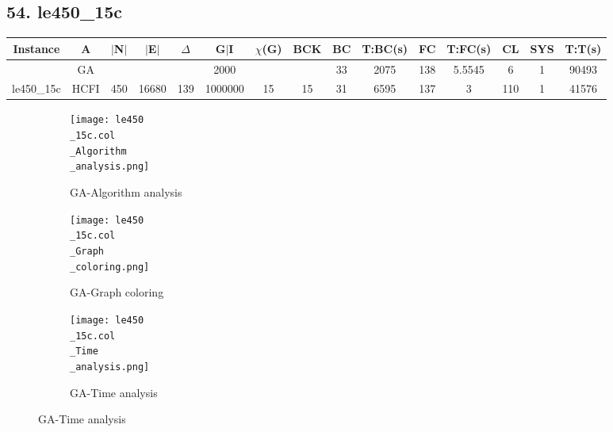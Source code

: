 \documentclass[10pt]{article}
\begin{document}
\subsection*{\hspace{0,9073976cm} 54. le450\_15c}
\begin{table}[H]
\centering
\begin{tabular}{|c|c|c|c|c|c|c|c|c|c|c|c|c|c|c|}
\hline
Instance& A &$|$N$|$ & $|$E$|$ & $\Delta$ & G$|$I & $\chi$(G) &BCK&BC & T:BC(s) & FC & T:FC(s) & CL & SYS & T:T(s) \\ \hline \hline

	&GA&       &                   &                     &   2000      &     \cellcolor{yellow} & {\cellcolor{yellow}}& {{\cellcolor{green}33}}
&2075   & 138        &5.5545                   &6                    &  1        &90493        \\ \cline{2-2} \cline{6-6} \cline{9-15}
 \multirow{-2}{*}{le450\_15c} &HCFI   &\multirow{-2}{*}{450}   &\multirow{-2}{*}{16680}     &\multirow{-2}{*}{139}     &1000000     &\multirow{-2}{*}{\cellcolor{yellow}15}      & \multirow{-2}{*}{\cellcolor{yellow}15}    &{\cellcolor{green}31}     &6595         &137    &3         &110    &1     & 41576       \\ \hline
\end{tabular}
\end{table}
\graphicspath{{./Core1/Solutions/GA/le450\_15c.col}}
\begin{figure}[H]
\begin{subfigure}{.33\textwidth}
  \centering
  \texttt{[image: le450\\\_15c.col\\\_Algorithm\\\_analysis.png]}
  \caption{GA-Algorithm analysis}
   \label{fig:subfig1}
\end{subfigure}%
\begin{subfigure}{.33\textwidth}
  \centering
  \texttt{[image: le450\\\_15c.col\\\_Graph\\\_coloring.png]}
  \caption{GA-Graph coloring}
  \label{fig:subfig2}
\end{subfigure}
\begin{subfigure}{.33\textwidth}
  \centering
  \texttt{[image: le450\\\_15c.col\\\_Time\\\_analysis.png]}
  \caption{GA-Time analysis}
  \end{subfigure}
\end{figure}
\end{document}
